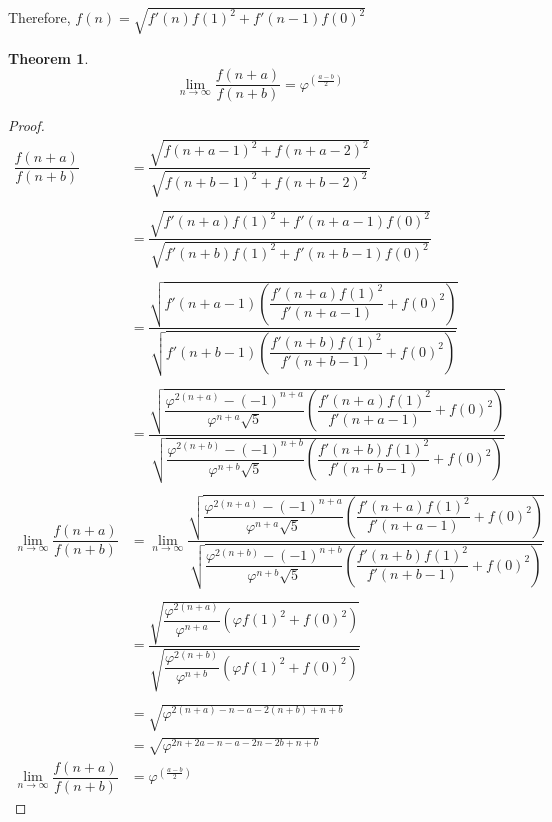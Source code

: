 \documentclass{article}
\newtheorem{theorem}{Theorem}[section]
\begin{document}
Therefore, $f(n) = \sqrt{f'(n)f(1)^2 + f'(n - 1)f(0)^2}$
\begin{theorem}
	\label{lim-cons}
$$\lim_{n \to \infty} \dfrac{f(n + a)}{f(n + b)} = \varphi^{\left (\displaystyle \frac{a - b}{2} \right)}$$
\end{theorem}
\begin{proof}
\begin{align*}
    \dfrac{f(n + a)}{f(n + b)} &= \dfrac{\sqrt{f(n + a -1)^2 + f(n + a - 2)^2}}{\sqrt{f(n + b - 1)^2 + f(n + b - 2)^2}}\\\\
    &= \dfrac{\sqrt{f'(n + a)f(1)^2 + f'(n + a - 1)f(0)^2}}{\sqrt{f'(n + b)f(1)^2 + f'(n + b - 1)f(0)^2}}\\\\
    &= \dfrac{\sqrt{f'(n + a - 1)\left(\dfrac{f'(n + a)f(1)^2}{f'(n + a - 1)} + f(0)^2\right)}}{\sqrt{f'(n + b - 1)\left(\dfrac{f'(n + b)f(1)^2}{f'(n + b - 1)} + f(0)^2\right)}}\\\\
    &= \dfrac{\sqrt{\dfrac{\varphi^{2(n + a)} - (-1)^{n + a}}{\varphi^{n + a}\sqrt{5}}\left(\dfrac{f'(n + a)f(1)^2}{f'(n + a - 1)} + f(0)^2\right)}}{\sqrt{\dfrac{\varphi^{2(n + b)} - (-1)^{n + b}}{\varphi^{n + b}\sqrt{5}}\left(\dfrac{f'(n + b)f(1)^2}{f'(n + b - 1)} + f(0)^2\right)}}\\\\
    \lim_{n \to \infty} \dfrac{f(n + a)}{f(n + b)}
    &= \lim_{n \to \infty} \dfrac{\sqrt{\dfrac{\varphi^{2(n + a)} - (-1)^{n + a}}{\varphi^{n + a}\sqrt{5}}\left(\dfrac{f'(n + a)f(1)^2}{f'(n + a - 1)} + f(0)^2\right)}}{\sqrt{\dfrac{\varphi^{2(n + b)} - (-1)^{n + b}}{\varphi^{n + b}\sqrt{5}}\left(\dfrac{f'(n + b)f(1)^2}{f'(n + b - 1)} + f(0)^2\right)}}\\\\
    &= \dfrac{\sqrt{\dfrac{\varphi^{2(n + a)}}{\varphi^{n + a}}\left(\varphi f(1)^2 + f(0)^2\right)}}{\sqrt{\dfrac{\varphi^{2(n + b)}}{\varphi^{n + b}}\left(\varphi f(1)^2 + f(0)^2\right)}}\\\\
    &= \sqrt{\varphi^{2(n + a) - n - a - 2(n + b) + n + b}}\\
    &= \sqrt{\varphi^{2n + 2a - n - a -2n -2b + n + b}}\\
    \lim_{n \to \infty} \dfrac{f(n + a)}{f(n + b)}
    &= \varphi^{\left (\displaystyle \frac{a - b}{2} \right)}
\end{align*}
\end{proof}
\end{document}
